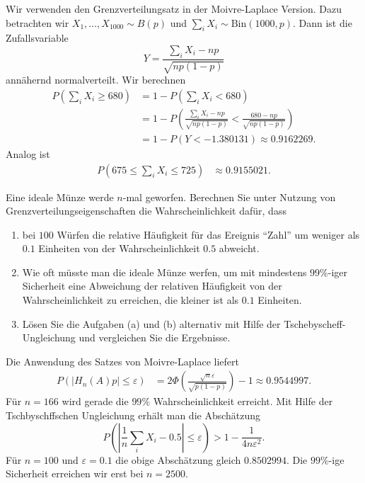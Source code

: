\solution Wir verwenden den Grenzverteilungsatz in der
Moivre-Laplace Version.  Dazu betrachten wir $X_1,\dots ,X_{1000} \sim B(p)$
und $\sum_{i} X_i \sim \text{Bin}(1000,p)$.  Dann ist die Zufallsvariable
\begin{equation*}
    Y = \frac{ \sum_{i} X_i - np}{ \sqrt{np(1-p)} } 
\end{equation*}
annähernd normalverteilt. Wir berechnen
\begin{align*}
    P( \sum_{i} X_i \geq 680 ) &= 1 - P\left( \sum_{i} X_i < 680 \right) \\
    &= 1- P\left( \frac{\sum_{i} X_i - np }{\sqrt{np(1-p)}} < \frac{680-np}{\sqrt{np(1-p)}} \right)\\
    &= 1-P( Y < - 1.380131 ) \approx 0.9162269.
\end{align*}
Analog ist 
\begin{align*}
    P( 675 \leq \sum_{i} X_i \leq 725 ) &\approx 0.9155021.
\end{align*}

 Eine ideale Münze werde $n$-mal 
geworfen. Berechnen Sie unter Nutzung von Grenzverteilungseigenschaften die Wahrscheinlichkeit dafür, dass 
\begin{enumerate}
    \item bei $100$ Würfen die relative Häufigkeit für das Ereignis 
        ``Zahl'' um weniger als $0.1$ Einheiten von der Wahrscheinlichkeit
        $0.5$ abweicht.
    \item Wie oft müsste man die ideale Münze werfen, um mit mindestens
        $99\%$-iger Sicherheit eine Abweichung der relativen Häufigkeit
        von der Wahrscheinlichkeit zu erreichen, die kleiner ist als $0.1$
        Einheiten. 
    \item Lösen Sie die Aufgaben (a) und (b) alternativ mit Hilfe der Tschebyscheff-Ungleichung und vergleichen Sie die Ergebnisse. 
\end{enumerate}

\solution Die Anwendung des Satzes von Moivre-Laplace liefert
\begin{align*}
    P\left( | H_n(A) p | \leq \varepsilon \right) &= 
    2 \Phi\left ( \frac{\sqrt{n} \varepsilon}{ \sqrt{ p(1-p) }  } \right) -1 \approx 0.9544997.
\end{align*}
Für $n=166$ wird gerade die $99\%$ Wahrscheinlichkeit erreicht. Mit Hilfe der Tschbyschffschen
Ungleichung erhält man die Abschätzung
\begin{equation}
    P \left( | \frac{1}{n} \sum_{i}^{} X_i - 0.5 | \leq \varepsilon \right) > 1 - \frac{1}{4 n \varepsilon^2}.
\end{equation}
Für $n=100$ und $\varepsilon=0.1$ die obige Abschätzung gleich $0.8502994$. Die $99\%$-ige
Sicherheit erreichen wir erst bei $n=2500$. 

